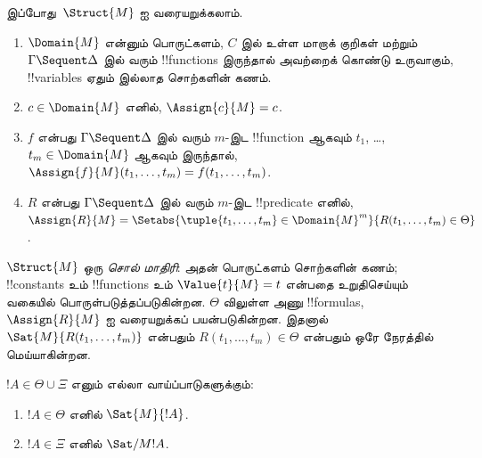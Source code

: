 \documentclass[../../../include/open-logic-section]{subfiles}
\begin{document}
இப்போது~$\Struct{M}$ ஐ வரையறுக்கலாம்.
\begin{enumerate}
\item $\Domain{M}$ என்னும் பொருட்களம், $C$ இல் உள்ள
மாறாக் குறிகள் மற்றும் $\Gamma \Sequent \Delta$ இல்
வரும் !!{function}s இருந்தால் அவற்றைக் கொண்டு உருவாகும்,
!!{variable}s ஏதும் இல்லாத சொற்களின் கணம்.
\item $c \in \Domain{M}$ எனில், $\Assign{c}{M} = c$.
\item $f$ என்பது $\Gamma \Sequent \Delta$ இல் வரும் $m$-இட
!!{function} ஆகவும் $t_1$, \dots, $t_m \in \Domain{M}$ ஆகவும்
இருந்தால், $\Assign{f}{M}(t_1, \dots, t_m) =
f(t_1, \dots, t_m)$.
\item $R$ என்பது $\Gamma \Sequent \Delta$ இல் வரும் $m$-இட
!!{predicate} எனில், $\Assign{R}{M} = \Setabs{\tuple{t_1, \dots, t_m} \in
\Domain{M}^m}{R(t_1, \dots, t_m) \in \Theta}$.
\end{enumerate}
$\Struct{M}$ ஒரு \emph{சொல் மாதிரி}: அதன் பொருட்களம் சொற்களின்
கணம்; !!{constant}s உம் !!{function}s உம்
$\Value{t}{M} = t$ என்பதை உறுதிசெய்யும் வகையில்
பொருள்படுத்தப்படுகின்றன. $\Theta$ விலுள்ள அணு !!{formula}s,
$\Assign{R}{M}$ ஐ வரையறுக்கப் பயன்படுகின்றன. இதனால்
$\Sat{M}{R(t_1, \dots, t_m)}$ என்பதும்
$R(t_1, \dots, t_m) \in \Theta$ என்பதும் ஒரே நேரத்தில்
மெய்யாகின்றன.

\begin{lem}
$!A \in \Theta \cup \Xi$ எனும் எல்லா வாய்ப்பாடுகளுக்கும்:
\begin{enumerate}
  \item $!A \in \Theta$ எனில் $\Sat{M}{!A}$.
  \item $!A \in \Xi$ எனில் $\Sat/{M}{!A}$.
\end{enumerate}
\end{lem}
\end{document}
